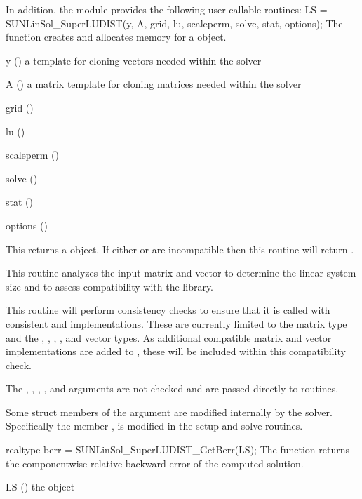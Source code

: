 In addition, the module {\sunlinsolsludist} provides the following user-callable routines: 
{
  LS = SUNLinSol\_SuperLUDIST(y, A, grid, lu, scaleperm, solve, stat, options);
}
{
  The function  creates and allocates memory for a
  {\sunlinsolsludist} object.
}
{
  \begin{args}[options]
  \item[y] ()
    a template for cloning vectors needed within the solver
  \item[A] ()
    a {\sunmatslunrloc} matrix template for cloning matrices needed
    within the solver 
  \item[grid] ()
  \item[lu] ()
  \item[scaleperm] ()
  \item[solve] ()
  \item[stat] ()
  \item[options] ()
  \end{args}
}
{
  This returns a  object.  If either  or
   are incompatible then this routine will return .
}
{
  This routine analyzes the input matrix and vector to determine the
  linear system size and to assess compatibility with the {\superludist}
  library.

  This routine will perform consistency checks to ensure that it is
  called with consistent {\nvector} and {\sunmatrix} implementations.
  These are currently limited to the {\sunmatslunrloc} matrix type
  and the {\nvecs}, {\nvecp}, {\nvecph}, {\nvecopenmp}, and {\nvecpthreads}
  vector types. As additional compatible matrix and vector implementations
  are added to {\sundials}, these will be included within this compatibility
  check.

  The , , , , and  arguments
  are not checked and are passed directly to {\superludist} routines.

  Some struct members of the  argument are modified internally
  by the {\sunlinsolsludist} solver. Specifically the member ,
  is modified in the setup and solve routines.
}

{
  realtype berr = SUNLinSol\_SuperLUDIST\_GetBerr(LS);
}
{
  The function  returns the componentwise
  relative backward error of the computed solution.
}
{
  \begin{args}[LS]
  \item[LS] ()
    the {\sunlinsolsludist} object
  \end{args}
}
{
}
{
}

